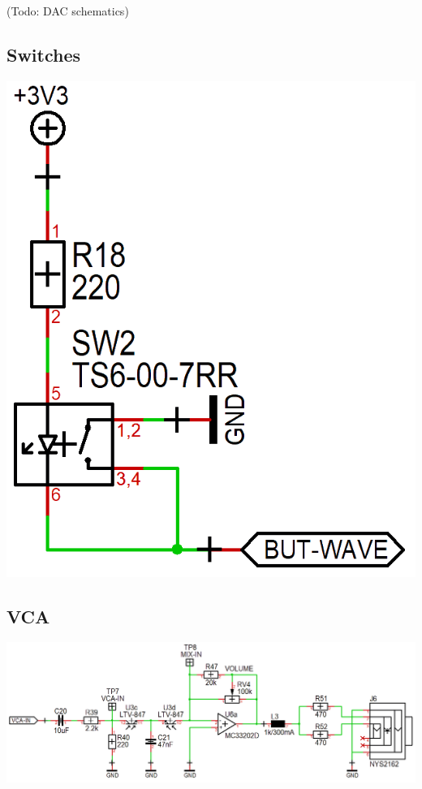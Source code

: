 \documentclass{scrartcl}
\begin{document}
\begin{center}
    (Todo: DAC schematics)
\end{center}

\subsection{Switches}

\begin{center}
    \includegraphics[scale=0.25]{assets/schema-switch.png}
\end{center}

\subsection{VCA}

\begin{center}
    \includegraphics[scale=0.37]{assets/schema-vca.png}
\end{center}
\end{document}
